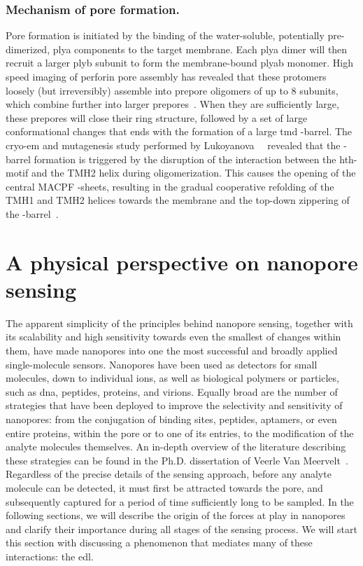 \subsubsection{Mechanism of pore formation.}
%

Pore formation is initiated by the binding of the water-soluble, potentially pre-dimerized, \gls{plya}
components to the target membrane. Each \gls{plya} dimer will then recruit a larger \gls{plyb} subunit to form
the membrane-bound \gls{plyab} monomer. High speed imaging of perforin pore assembly has revealed that these
protomers loosely (but irreversibly) assemble into prepore oligomers of up to 8 subunits, which combine
further into larger prepores~\cite{Leung-2017}. When they are sufficiently large, these prepores will close
their ring structure, followed by a set of large conformational changes that ends with the formation of a
large \gls{tmd} \tb-barrel. The \gls{cryo-em} and mutagenesis study performed by
Lukoyanova~\etal{}~\cite{Lukoyanova-Kondos-2015} revealed that the \tb-barrel formation is triggered by the
disruption of the interaction between the \gls{hth}-motif and the {TMH2} helix during oligomerization. This
causes the opening of the central {MACPF} \tb-sheets, resulting in the gradual cooperative refolding of the
{TMH1} and {TMH2} helices towards the membrane and the top-down zippering of the
\tb-barrel~\cite{Reboul-2016}.


%
\clearpage
%

%
%
\section{A physical perspective on nanopore sensing}
%
\label{sec:np:physical_perspective}
%

The apparent simplicity of the principles behind nanopore sensing, together with its scalability and high
sensitivity towards even the smallest of changes within them, have made nanopores into one the most successful
and broadly applied single-molecule sensors. Nanopores have been used as detectors for small molecules, down
to individual ions, as well as biological polymers or particles, such as \gls{dna}, peptides, proteins, and
virions. Equally broad are the number of strategies that have been deployed to improve the selectivity and
sensitivity of nanopores: from the conjugation of binding sites, peptides, aptamers, or even entire proteins,
within the pore or to one of its entries, to the modification of the analyte molecules themselves. An in-depth
overview of the literature describing these strategies can be found in the Ph.D. dissertation of Veerle Van
Meervelt~\cite{VanMeervelt-2017-PhD}. Regardless of the precise details of the sensing approach, before any
analyte molecule can be detected,  it must first be attracted towards the pore, and subsequently captured for
a period of time sufficiently long to be sampled. In the following sections, we will describe the origin of
the forces at play in nanopores and clarify their importance during all stages of the sensing process. We will
start this section with discussing a phenomenon that mediates many of these interactions: the \gls{edl}.


